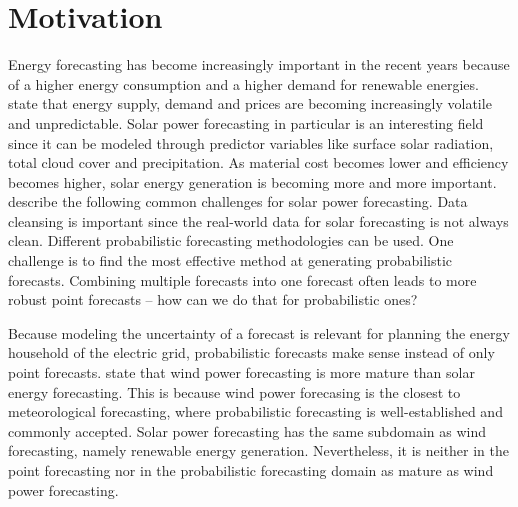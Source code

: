 \section{Motivation}
\label{sec:motivation}


Energy forecasting has become increasingly important in the recent years 
because of a higher energy consumption and a higher demand 
for renewable energies. 
\Textcite{Hong2016} state that energy supply, demand and prices are becoming increasingly 
volatile and unpredictable. 
Solar power forecasting in particular is an interesting field since it can be modeled through predictor variables 
like surface solar radiation, total cloud cover and precipitation. 
As material cost becomes lower and efficiency becomes higher, solar energy generation is becoming more and more important. 
\Textcite{Hong2016} describe the following common challenges for solar power forecasting.
Data cleansing is important since the real-world data for solar forecasting is not always clean. 
Different probabilistic forecasting methodologies can be used. One challenge is to find the most effective method at generating probabilistic forecasts. 
Combining multiple forecasts into one forecast often leads to more robust point forecasts -- how can we do that for probabilistic ones?


Because modeling the uncertainty of a forecast is relevant for planning the energy household of the electric grid, 
probabilistic forecasts make sense instead of only point forecasts. 
\Textcite{Hong2016} state that wind power forecasting is 
more mature than solar energy forecasting. This is because 
wind power forecasing is the closest to meteorological forecasting, 
where probabilistic forecasting is well-established and commonly accepted.
Solar power forecasting has the same subdomain as wind forecasting, namely renewable energy generation. 
Nevertheless, it is neither in the 
point forecasting nor in the probabilistic forecasting domain as mature 
as wind power forecasting. 


